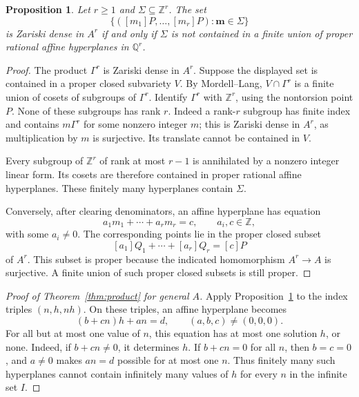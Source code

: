 \documentclass[11pt,a4paper]{article}
\newtheorem{proposition}[theorem]{Proposition}
\theoremstyle{remark}\newtheorem{remark}[theorem]{Remark}
\newcommand{\Z}{\mathbb Z}\newcommand{\Q}{\mathbb Q}
\begin{document}
\begin{proposition}\label{prop:criterion}
Let \(r\ge1\) and \(\Sigma\subseteq\Z^r\).
The set
\[
          \{([m_1]P,\ldots,[m_r]P):\mathbf m\in\Sigma\}
\]
is Zariski dense in \(A^r\) if and only if \(\Sigma\) is not
contained in a finite union of proper rational affine hyperplanes
in \(\Q^r\).
\end{proposition}

\begin{proof}
The product \(\Gamma^r\) is Zariski dense in \(A^r\).
Suppose the displayed set is contained in a proper closed
subvariety \(V\). By Mordell--Lang, \(V\cap\Gamma^r\) is a
finite union of cosets of subgroups of \(\Gamma^r\).
Identify \(\Gamma^r\) with \(\Z^r\), using the nontorsion point
\(P\). None of these subgroups has rank \(r\). Indeed a
rank-\(r\) subgroup has finite index and contains \(m\Gamma^r\)
for some nonzero integer \(m\); this is Zariski dense in \(A^r\),
as multiplication by \(m\) is surjective. Its translate cannot
be contained in \(V\).

Every subgroup of \(\Z^r\) of rank at most \(r-1\) is annihilated
by a nonzero integer linear form. Its cosets are therefore
contained in proper rational affine hyperplanes.
These finitely many hyperplanes contain \(\Sigma\).

Conversely, after clearing denominators, an affine hyperplane
has equation
\[
                   a_1m_1+\cdots+a_rm_r=c,
                   \qquad a_i,c\in\Z,
\]
with some \(a_i\ne0\). The corresponding points lie in the
proper closed subset
\[
             [a_1]Q_1+\cdots+[a_r]Q_r=[c]P
\]
of \(A^r\). This subset is proper because the indicated
homomorphism \(A^r\to A\) is surjective.
A finite union of such proper closed subsets is still proper.
\end{proof}

\begin{proof}[Proof of Theorem~\ref{thm:product} for general \(A\)]
Apply Proposition~\ref{prop:criterion} to the index triples
\((n,h,nh)\).
On these triples, an affine hyperplane becomes
\[
                  (b+cn)h+an=d,
                  \qquad (a,b,c)\ne(0,0,0).
\]
For all but at most one value of \(n\), this equation has at
most one solution \(h\), or none.
Indeed, if \(b+cn\ne0\), it determines \(h\).
If \(b+cn=0\) for all \(n\), then \(b=c=0\), and \(a\ne0\)
makes \(an=d\) possible for at most one \(n\).
Thus finitely many such hyperplanes cannot contain infinitely
many values of \(h\) for every \(n\) in the infinite set \(I\).
\end{proof}
\end{document}
